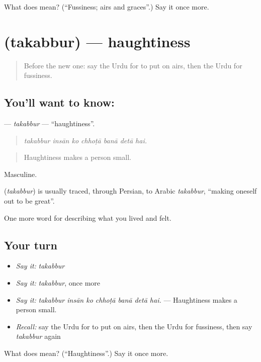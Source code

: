 \begin{tcolorbox}[breakable,colback=teal!4,colframe=teal!35!black,title={Before you move on}]
What does  mean? (\textquotedblleft{}Fussiness; airs and graces\textquotedblright{}.) Say it once more.
\end{tcolorbox}
\section[\texorpdfstring{\ur{تکبر} (takabbur)}{تکبر (takabbur)}]{ (takabbur) — haughtiness}

\label{lesson:UR-C452-takabbur}



\begin{quote}
Before the new one: say the Urdu for to put on airs, then the Urdu for fussiness.
\end{quote}

\subsection*{You'll want to know: }
\textbf{} — \emph{takabbur} — \textquotedblleft{}haughtiness\textquotedblright{}.

\begin{quote}
      
\end{quote}

\begin{quote}
\emph{takabbur insān ko chhoṭā banā detā hai.}
\end{quote}

\begin{quote}
Haughtiness makes a person small.
\end{quote}

Masculine.

\begin{cousinweb}
\textbf{} (\emph{takabbur}) is usually traced, through Persian, to Arabic \emph{takabbur}, \textquotedblleft{}making oneself out to be great\textquotedblright{}.
\end{cousinweb}

\begin{grammarlens}[title={What you've built}]
One more word for describing what you lived and felt.
\end{grammarlens}

\subsection*{Your turn}
\begin{itemize}
\raggedright
  \item \emph{Say it:} \emph{takabbur}
  \item \emph{Say it:} \emph{takabbur}, once more
  \item \emph{Say it:} \emph{takabbur insān ko chhoṭā banā detā hai.} — Haughtiness makes a person small.
  \item \emph{Recall:} say the Urdu for to put on airs, then the Urdu for fussiness, then say \emph{takabbur} again
\end{itemize}

\begin{tcolorbox}[breakable,colback=teal!4,colframe=teal!35!black,title={Before you move on}]
What does  mean? (\textquotedblleft{}Haughtiness\textquotedblright{}.) Say it once more.
\end{tcolorbox}
